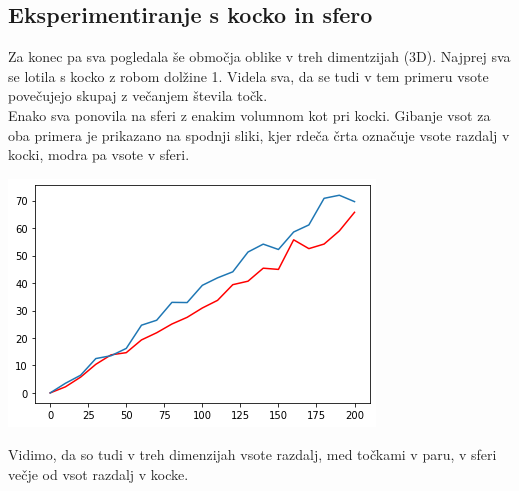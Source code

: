 \documentclass[12pt, a4paper]{article}
\begin{document}
\subsection{Eksperimentiranje s kocko in sfero}
Za konec pa sva pogledala še območja oblike v treh dimentzijah (3D). Najprej sva se lotila s kocko z robom dolžine 1. Videla sva, da se tudi v tem primeru vsote povečujejo skupaj z večanjem števila točk.\\
Enako sva ponovila na sferi z enakim volumnom kot pri kocki. Gibanje vsot za oba primera je prikazano na spodnji sliki, kjer rdeča črta označuje vsote razdalj v kocki, modra pa vsote v sferi.
\begin{center}
\includegraphics{primerjava_kocka_sfera.png}
\end{center}
Vidimo, da so tudi v treh dimenzijah vsote razdalj, med točkami v paru, v sferi večje od vsot razdalj v kocke.
\end{document}
